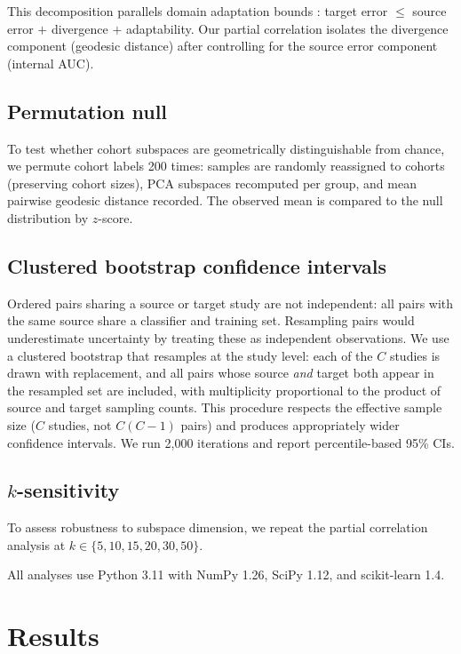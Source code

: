 \documentclass{article}
\begin{document}
This decomposition parallels domain adaptation bounds \citep{bendavid2010theory, mansour2009domain}: target error $\leq$ source error $+$ divergence $+$ adaptability. Our partial correlation isolates the divergence component (geodesic distance) after controlling for the source error component (internal AUC).

\subsection{Permutation null}

To test whether cohort subspaces are geometrically distinguishable from chance, we permute cohort labels 200 times: samples are randomly reassigned to cohorts (preserving cohort sizes), PCA subspaces recomputed per group, and mean pairwise geodesic distance recorded. The observed mean is compared to the null distribution by $z$-score.

\subsection{Clustered bootstrap confidence intervals}

Ordered pairs sharing a source or target study are not independent: all pairs with the same source share a classifier and training set. Resampling pairs would underestimate uncertainty by treating these as independent observations. We use a clustered bootstrap that resamples at the study level: each of the $C$ studies is drawn with replacement, and all pairs whose source \emph{and} target both appear in the resampled set are included, with multiplicity proportional to the product of source and target sampling counts. This procedure respects the effective sample size ($C$ studies, not $C(C-1)$ pairs) and produces appropriately wider confidence intervals. We run 2{,}000 iterations and report percentile-based 95\% CIs.

\subsection{$k$-sensitivity}

To assess robustness to subspace dimension, we repeat the partial correlation analysis at $k \in \{5, 10, 15, 20, 30, 50\}$.

All analyses use Python 3.11 with NumPy 1.26, SciPy 1.12, and scikit-learn 1.4.


\section{Results}
\end{document}
